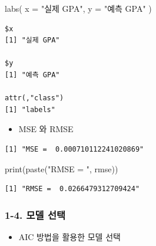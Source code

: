 \documentclass[
  letterpaper,
  DIV=11,
  numbers=noendperiod]{scrartcl}
\newenvironment{Shaded}{\begin{snugshade}}{\end{snugshade}}
\newcommand{\AttributeTok}[1]{\textcolor[rgb]{0.40,0.45,0.13}{#1}}
\newcommand{\CommentTok}[1]{\textcolor[rgb]{0.37,0.37,0.37}{#1}}
\newcommand{\DecValTok}[1]{\textcolor[rgb]{0.68,0.00,0.00}{#1}}
\newcommand{\FunctionTok}[1]{\textcolor[rgb]{0.28,0.35,0.67}{#1}}
\newcommand{\NormalTok}[1]{\textcolor[rgb]{0.00,0.23,0.31}{#1}}
\newcommand{\OtherTok}[1]{\textcolor[rgb]{0.00,0.23,0.31}{#1}}
\newcommand{\SpecialCharTok}[1]{\textcolor[rgb]{0.37,0.37,0.37}{#1}}
\newcommand{\StringTok}[1]{\textcolor[rgb]{0.13,0.47,0.30}{#1}}
\providecommand{\tightlist}{%
  \setlength{\itemsep}{0pt}\setlength{\parskip}{0pt}}\usepackage{longtable,booktabs,array}
\begin{document}
\begin{Shaded}
\begin{Highlighting}[]
  \FunctionTok{labs}\NormalTok{( }
    \AttributeTok{x =} \StringTok{"실제 GPA"}\NormalTok{, }\AttributeTok{y =} \StringTok{"예측 GPA"}
\NormalTok{    )}
\end{Highlighting}
\end{Shaded}

\begin{verbatim}
$x
[1] "실제 GPA"

$y
[1] "예측 GPA"

attr(,"class")
[1] "labels"
\end{verbatim}

\begin{itemize}
\tightlist
\item
  MSE 와 RMSE
\end{itemize}

\begin{Shaded}
\end{Shaded}

\begin{verbatim}
[1] "MSE =  0.000710112241020869"
\end{verbatim}

\begin{Shaded}
\begin{Highlighting}[]
\FunctionTok{print}\NormalTok{(}\FunctionTok{paste}\NormalTok{(}\StringTok{"RMSE = "}\NormalTok{, rmse))}
\end{Highlighting}
\end{Shaded}

\begin{verbatim}
[1] "RMSE =  0.0266479312709424"
\end{verbatim}

\subsubsection{1-4. 모델 선택}\label{uxbaa8uxb378-uxc120uxd0dd}

\begin{itemize}
\tightlist
\item
  AIC 방법을 활용한 모델 선택
\end{itemize}
\end{document}
